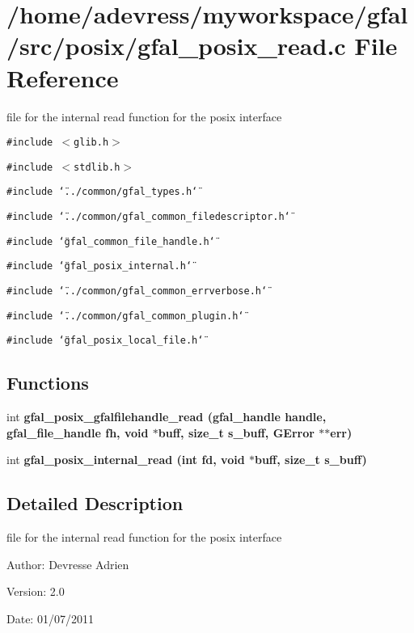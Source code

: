 \section{/home/adevress/myworkspace/gfal/src/posix/gfal\_\-posix\_\-read.c File Reference}
\label{gfal__posix__read_8c}
file for the internal read function for the posix interface 

{\tt \#include $<$glib.h$>$}\par
{\tt \#include $<$stdlib.h$>$}\par
{\tt \#include \char`\"{}../common/gfal\_\-types.h\char`\"{}}\par
{\tt \#include \char`\"{}../common/gfal\_\-common\_\-filedescriptor.h\char`\"{}}\par
{\tt \#include \char`\"{}gfal\_\-common\_\-file\_\-handle.h\char`\"{}}\par
{\tt \#include \char`\"{}gfal\_\-posix\_\-internal.h\char`\"{}}\par
{\tt \#include \char`\"{}../common/gfal\_\-common\_\-errverbose.h\char`\"{}}\par
{\tt \#include \char`\"{}../common/gfal\_\-common\_\-plugin.h\char`\"{}}\par
{\tt \#include \char`\"{}gfal\_\-posix\_\-local\_\-file.h\char`\"{}}\par
\subsection*{Functions}
\begin{CompactItemize}
\item 
int \bf{gfal\_\-posix\_\-gfalfilehandle\_\-read} (gfal\_\-handle handle, gfal\_\-file\_\-handle fh, void $\ast$buff, size\_\-t s\_\-buff, GError $\ast$$\ast$err)
\item 
int \bf{gfal\_\-posix\_\-internal\_\-read} (int fd, void $\ast$buff, size\_\-t s\_\-buff)
\end{CompactItemize}


\subsection{Detailed Description}
file for the internal read function for the posix interface 

\begin{Desc}
\item[Author:]Devresse Adrien \end{Desc}
\begin{Desc}
\item[Version:]2.0 \end{Desc}
\begin{Desc}
\item[Date:]01/07/2011 \end{Desc}


